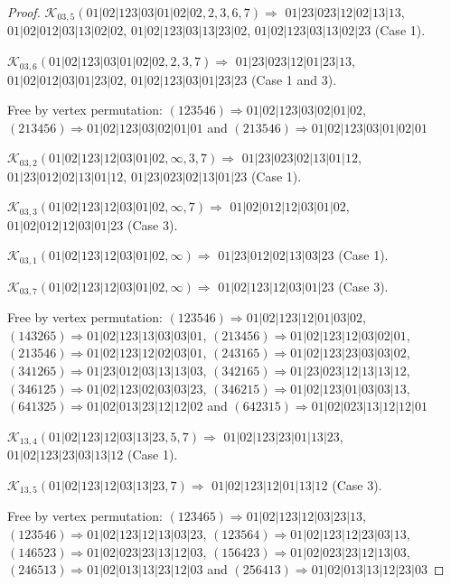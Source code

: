 \documentclass[12pt]{article}
\theoremstyle{plain}
\theoremstyle{definition}
\theoremstyle{remark}
\newcommand{\fancy}[1]{\mathcal{#1}}
\def\K{\fancy{K}}
\begin{document}
\begin{proof}
	
	
	\bigskip
	
	$\K_{03,5}(01|02|123|03|01|02|02,2, 3, 6, 7)\Rightarrow $ $01|23|023|12|02|13|13$, $01|02|012|03|13|02|02$, $01|02|123|03|13|23|02$, $01|02|123|03|13|02|23$ (Case 1).
	
	$\K_{03,6}(01|02|123|03|01|02|02,2, 3, 7)\Rightarrow $ $01|23|023|12|01|23|13$, $01|02|012|03|01|23|02$, $01|02|123|03|01|23|23$ (Case 1 and 3).
	
	
	
	Free by vertex permutation: $(1 2 3 5 4 6)\Rightarrow 01|02|123|03|02|01|02$, $(2 1 3 4 5 6)\Rightarrow 01|02|123|03|02|01|01$ and $(2 1 3 5 4 6)\Rightarrow 01|02|123|03|01|02|01$
	
	
	
	\bigskip
	
	$\K_{03,2}(01|02|123|12|03|01|02,\infty,3, 7)\Rightarrow $ $01|23|023|02|13|01|12$, $01|23|012|02|13|01|12$, $01|23|023|02|13|01|23$ (Case 1).
	
	$\K_{03,3}(01|02|123|12|03|01|02,\infty,7)\Rightarrow $ $01|02|012|12|03|01|02$, $01|02|012|12|03|01|23$ (Case 3).
	
	$\K_{03,1}(01|02|123|12|03|01|02,\infty)\Rightarrow $ $01|23|012|02|13|03|23$ (Case 1).
	
	$\K_{03,7}(01|02|123|12|03|01|02,\infty)\Rightarrow $ $01|02|123|12|03|01|23$ (Case 3).
	
	
	
	Free by vertex permutation: $(1 2 3 5 4 6)\Rightarrow 01|02|123|12|01|03|02$, $(1 4 3 2 6 5)\Rightarrow 01|02|123|13|03|03|01$, $(2 1 3 4 5 6)\Rightarrow 01|02|123|12|03|02|01$, $(2 1 3 5 4 6)\Rightarrow 01|02|123|12|02|03|01$, $(2 4 3 1 6 5)\Rightarrow 01|02|123|23|03|03|02$, $(3 4 1 2 6 5)\Rightarrow 01|23|012|03|13|13|03$, $(3 4 2 1 6 5)\Rightarrow 01|23|023|12|13|13|12$, $(3 4 6 1 2 5)\Rightarrow 01|02|123|02|03|03|23$, $(3 4 6 2 1 5)\Rightarrow 01|02|123|01|03|03|13$, $(6 4 1 3 2 5)\Rightarrow 01|02|013|23|12|12|02$ and $(6 4 2 3 1 5)\Rightarrow 01|02|023|13|12|12|01$
	
	
	
	\bigskip
	
	$\K_{13,4}(01|02|123|12|03|13|23,5, 7)\Rightarrow $ $01|02|123|23|01|13|23$, $01|02|123|23|03|13|12$ (Case 1).
	
	$\K_{13,5}(01|02|123|12|03|13|23,7)\Rightarrow $ $01|02|123|12|01|13|12$ (Case 3).
	
	
	
	Free by vertex permutation: $(1 2 3 4 6 5)\Rightarrow 01|02|123|12|03|23|13$, $(1 2 3 5 4 6)\Rightarrow 01|02|123|12|13|03|23$, $(1 2 3 5 6 4)\Rightarrow 01|02|123|12|23|03|13$, $(1 4 6 5 2 3)\Rightarrow 01|02|023|23|13|12|03$, $(1 5 6 4 2 3)\Rightarrow 01|02|023|23|12|13|03$, $(2 4 6 5 1 3)\Rightarrow 01|02|013|13|23|12|03$ and $(2 5 6 4 1 3)\Rightarrow 01|02|013|13|12|23|03$
	

\end{proof}
\end{document}
